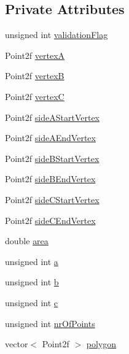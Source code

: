 \subsection*{Private Attributes}
\begin{DoxyCompactItemize}
\item 
unsigned int \hyperlink{classmultiscale_1_1MinEnclosingTriangleFinder_a19f9149638eddeec22b775eef632c6ef}{validation\-Flag}
\item 
Point2f \hyperlink{classmultiscale_1_1MinEnclosingTriangleFinder_adb758ed8b7e8758436d9f1bb381e017e}{vertex\-A}
\item 
Point2f \hyperlink{classmultiscale_1_1MinEnclosingTriangleFinder_a18e5ea5e0b341b3d02c4a75887f44c9c}{vertex\-B}
\item 
Point2f \hyperlink{classmultiscale_1_1MinEnclosingTriangleFinder_a0fc6887251f73b19714f39888534cdaa}{vertex\-C}
\item 
Point2f \hyperlink{classmultiscale_1_1MinEnclosingTriangleFinder_a2e9e3f20e0c0d8bcf34e8ce903aabb42}{side\-A\-Start\-Vertex}
\item 
Point2f \hyperlink{classmultiscale_1_1MinEnclosingTriangleFinder_a132a1e2eed61d579e6038089fe08d150}{side\-A\-End\-Vertex}
\item 
Point2f \hyperlink{classmultiscale_1_1MinEnclosingTriangleFinder_a5f6c0f9361e4aab168f068f08b700742}{side\-B\-Start\-Vertex}
\item 
Point2f \hyperlink{classmultiscale_1_1MinEnclosingTriangleFinder_a8e3929795823c49572ff65a4f04462c6}{side\-B\-End\-Vertex}
\item 
Point2f \hyperlink{classmultiscale_1_1MinEnclosingTriangleFinder_a877d0c34c4803643699d8fd176c24d4e}{side\-C\-Start\-Vertex}
\item 
Point2f \hyperlink{classmultiscale_1_1MinEnclosingTriangleFinder_a3f0f5bbef4e89caed8d153f1fc2eccea}{side\-C\-End\-Vertex}
\item 
double \hyperlink{classmultiscale_1_1MinEnclosingTriangleFinder_a64ea18728dc70fd6235961c12802123a}{area}
\item 
unsigned int \hyperlink{classmultiscale_1_1MinEnclosingTriangleFinder_acb13371219bdd9b7c57131f1535e4c89}{a}
\item 
unsigned int \hyperlink{classmultiscale_1_1MinEnclosingTriangleFinder_a71355f44126b38a4fb55c0c92ab64816}{b}
\item 
unsigned int \hyperlink{classmultiscale_1_1MinEnclosingTriangleFinder_a758f39b2d0cf35337f28d8ed871c2c0b}{c}
\item 
unsigned int \hyperlink{classmultiscale_1_1MinEnclosingTriangleFinder_a92409868a6731f5e41878085f3ac0f73}{nr\-Of\-Points}
\item 
vector$<$ Point2f $>$ \hyperlink{classmultiscale_1_1MinEnclosingTriangleFinder_add5aecf2c138345091d55076bdc253a4}{polygon}
\end{DoxyCompactItemize}
